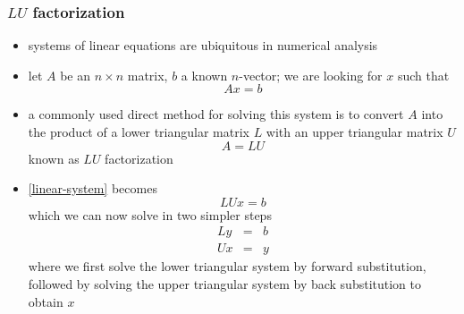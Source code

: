%
%
%
%


\begin{frame}[fragile]
%
  \frametitle{$LU$ factorization}
%
  \begin{itemize}
%
  \item systems of linear equations are ubiquitous in numerical analysis
  \item let $A$ be an $n \times n$ matrix, $b$ a known $n$-vector; we are looking for $x$ such
    that
    \begin{equation}
      A x = b \label{eq:linear-system}
    \end{equation}
  \item a commonly used direct method for solving this system is to convert $A$ into the
    product of a lower triangular matrix $L$ with an upper triangular matrix $U$
    \begin{equation}
      A = L U \label{eq:LU-factorization}
    \end{equation}
    known as $LU$ factorization
  \item \eqref{linear-system} becomes
    \begin{equation}
      L U x = b
    \end{equation}
    which we can now solve in two simpler steps
    \begin{eqnarray}
        L y & = & b \\
        U x & = & y
    \end{eqnarray}
    where we first solve the lower triangular system by forward substitution, followed by
    solving the upper triangular system by back substitution to obtain $x$
%
  \end{itemize}
%
\end{frame}

